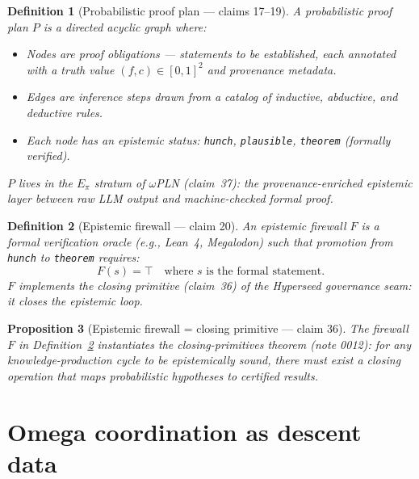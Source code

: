 \documentclass[11pt,a4paper]{article}
\newtheorem{definition}{Definition}[section]
\newtheorem{proposition}[definition]{Proposition}
\begin{document}
\begin{definition}[Probabilistic proof plan --- claims 17--19]
\label{def:proof-plan}
A \emph{probabilistic proof plan} $P$ is a directed acyclic graph where:
\begin{itemize}
\item Nodes are \emph{proof obligations} --- statements to be established,
  each annotated with a truth value $(f,c) \in [0,1]^2$ and provenance
  metadata.
\item Edges are \emph{inference steps} drawn from a catalog of
  inductive, abductive, and deductive rules.
\item Each node has an epistemic status: \texttt{hunch}, \texttt{plausible},
  \texttt{theorem} (formally verified).
\end{itemize}
$P$ lives in the $E_\pi$ stratum of $\omega$PLN (claim~37): the
provenance-enriched epistemic layer between raw LLM output and
machine-checked formal proof.
\end{definition}

\begin{definition}[Epistemic firewall --- claim 20]
\label{def:firewall}
An \emph{epistemic firewall} $F$ is a formal verification oracle
(e.g., Lean~4, Megalodon) such that promotion from \texttt{hunch} to
\texttt{theorem} requires:
\[
  F(s) = \top \quad \text{where } s \text{ is the formal statement}.
\]
$F$ implements the \emph{closing primitive} (claim~36) of the Hyperseed
governance seam: it closes the epistemic loop.
\end{definition}

\begin{proposition}[Epistemic firewall = closing primitive --- claim 36]
The firewall $F$ in Definition~\ref{def:firewall} instantiates the
closing-primitives theorem (note 0012): for any knowledge-production
cycle to be epistemically sound, there must exist a closing operation
that maps probabilistic hypotheses to certified results.
\end{proposition}

\section{Omega coordination as descent data}
\label{sec:omega-descent}
\end{document}
